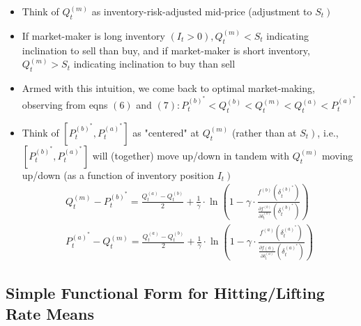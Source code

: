 \documentclass[10pt]{article}
\begin{document}
\begin{itemize} 
    \item Think of $Q_{t}^{(m)}$ as inventory-risk-adjusted mid-price (adjustment to $\left.S_{t}\right)$
    \item If market-maker is long inventory $\left(I_{t}>0\right), Q_{t}^{(m)}<S_{t}$ indicating inclination to sell than buy, and if market-maker is short inventory, $Q_{t}^{(m)}>S_{t}$ indicating inclination to buy than sell
    \item Armed with this intuition, we come back to optimal market-making, observing from eqns $(6)$ and $(7): P_{t}^{(b)^{*}}<Q_{t}^{(b)}<Q_{t}^{(m)}<Q_{t}^{(a)}<P_{t}^{(a)^{*}}$
    \item Think of $\left[P_{t}^{(b)^{*}}, P_{t}^{(a)^{*}}\right]$ as "centered" at $Q_{t}^{(m)}$ (rather than at $\left.S_{t}\right)$,
    i.e., $\left[P_{t}^{(b)^{*}}, P_{t}^{(a)^{*}}\right]$ will (together) move up/down in tandem with $Q_{t}^{(m)}$ moving up/down (as a function of inventory position $\left.I_{t}\right)$
    \[
    \begin{array}{c}
    Q_{t}^{(m)}-P_{t}^{(b)^{*}}=\frac{Q_{t}^{(a)}-Q_{t}^{(b)}}{2}+\frac{1}{\gamma} \cdot \ln \left(1-\gamma \cdot \frac{f^{(b)}\left(\delta_{t}^{(b)^{*}}\right)}{\frac{\partial f^{(b)}}{\partial \delta_{t}^{(b)}}\left(\delta_{t}^{(b)^{*}}\right)}\right) \tag{9,10}\\
    P_{t}^{(a)^{*}}-Q_{t}^{(m)}=\frac{Q_{t}^{(a)}-Q_{t}^{(b)}}{2}+\frac{1}{\gamma} \cdot \ln \left(1-\gamma \cdot \frac{f^{(a)}\left(\delta_{t}^{(a)^{*}}\right)}{\frac{\partial f(a)}{\partial \delta_{t}^{(a)}}\left(\delta_{t}^{(a)^{*}}\right)}\right)
    \end{array} 
    \]
\end{itemize}

\subsection{Simple Functional Form for Hitting/Lifting Rate Means}
\end{document}
